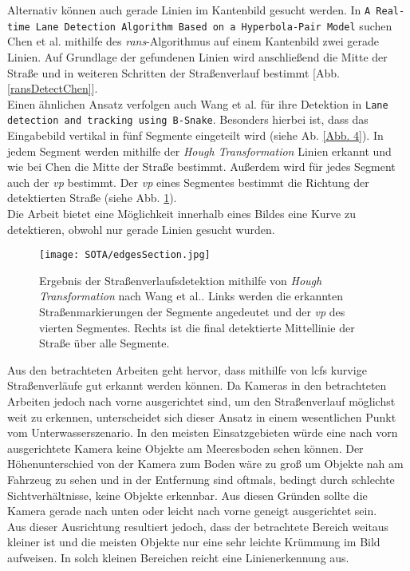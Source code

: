 Alternativ können auch gerade Linien im Kantenbild gesucht werden. In \texttt{A Real-time Lane Detection Algorithm Based on a Hyperbola-Pair Model} \cite{chen2006real} suchen Chen et al. mithilfe des \textit{\gls{rans}}-Algorithmus auf einem Kantenbild zwei gerade Linien. Auf Grundlage der gefundenen Linien wird anschließend die Mitte der Straße und in weiteren Schritten der Straßenverlauf bestimmt [Abb. \ref{ransDetectChen}].\\

Einen ähnlichen Ansatz verfolgen auch Wang et al. für ihre Detektion in \texttt{Lane detection and tracking using B-Snake}\cite{wang2004lane}. Besonders hierbei ist, dass das Eingabebild vertikal in fünf Segmente eingeteilt wird (siehe Ab. \ref{Abb. 4}). In jedem Segment werden mithilfe der \textit{Hough Transformation} Linien erkannt und wie bei Chen die Mitte der Straße bestimmt. Außerdem wird für jedes Segment auch der \textit{\gls{vp}} bestimmt. Der \textit{\gls{vp}} eines Segmentes bestimmt die Richtung der detektierten Straße (siehe Abb. \ref{detHough}).\\
Die Arbeit bietet eine Möglichkeit innerhalb eines Bildes eine Kurve zu detektieren, obwohl nur gerade Linien gesucht wurden.
\begin{figure}[H]
\centering
\texttt{[image: SOTA/edgesSection.jpg]}
\caption[Detektion eines Straßenverlaufs mit der \textit{Hough Transformation}]{Ergebnis der Straßenverlaufsdetektion mithilfe von \textit{Hough Transformation} nach Wang et al.. Links werden die erkannten Straßenmarkierungen der Segmente angedeutet und der \textit{\gls{vp}} des vierten Segmentes. Rechts ist die final detektierte Mittellinie der Straße über alle Segmente.}
\label{detHough}
\end{figure}
Aus den betrachteten Arbeiten geht hervor, dass mithilfe von \glspl{lcf} kurvige Straßenverläufe gut erkannt werden können. Da Kameras in den betrachteten Arbeiten jedoch nach vorne ausgerichtet sind, um den Straßenverlauf möglichst weit zu erkennen, unterscheidet sich dieser Ansatz in einem wesentlichen Punkt vom Unterwasserszenario. In den meisten Einsatzgebieten würde eine nach vorn ausgerichtete Kamera keine Objekte am Meeresboden sehen können. Der Höhenunterschied von der Kamera zum Boden wäre zu groß um Objekte nah am Fahrzeug zu sehen und in der Entfernung sind oftmals, bedingt durch schlechte Sichtverhältnisse, keine Objekte erkennbar. Aus diesen Gründen sollte die Kamera gerade nach unten oder leicht nach vorne geneigt ausgerichtet sein.\\
Aus dieser Ausrichtung resultiert jedoch, dass der betrachtete Bereich weitaus kleiner ist und die meisten Objekte nur eine sehr leichte Krümmung im Bild aufweisen. In solch kleinen Bereichen reicht eine Linienerkennung aus.

